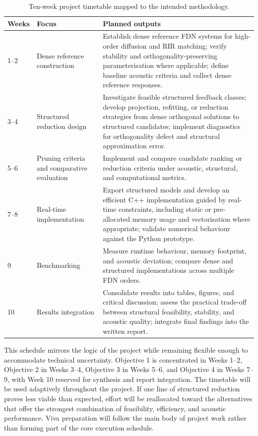 \documentclass[12pt,a4paper]{article}
\begin{document}
\begin{table}[!htbp]
\centering
\caption{Ten-week project timetable mapped to the intended methodology.}
\label{tab:timetable}
\begin{tabular}{|p{1.2cm}|p{3.5cm}|p{10.0cm}|}
\toprule
\textbf{Weeks} & \textbf{Focus} & \textbf{Planned outputs} \\
\midrule
1--2 & Dense reference construction & Establish dense reference FDN systems for high-order diffusion and RIR matching; verify stability and orthogonality-preserving parameterisation where applicable; define baseline acoustic criteria and collect dense reference responses. \\
3--4 & Structured reduction design & Investigate feasible structured feedback classes; develop projection, refitting, or reduction strategies from dense orthogonal solutions to structured candidates; implement diagnostics for orthogonality defect and structural approximation error. \\
5--6 & Pruning criteria and comparative evaluation & Implement and compare candidate ranking or reduction criteria under acoustic, structural, and computational metrics. \\
7--8 & Real-time implementation & Export structured models and develop an efficient C++ implementation guided by real-time constraints, including static or pre-allocated memory usage and vectorisation where appropriate; validate numerical behaviour against the Python prototype. \\
9 & Benchmarking & Measure runtime behaviour, memory footprint, and acoustic deviation; compare dense and structured implementations across multiple FDN orders. \\
10 & Results integration & Consolidate results into tables, figures, and critical discussion; assess the practical trade-off between structural feasibility, stability, and acoustic quality; integrate final findings into the written report. \\
\bottomrule
\end{tabular}
\end{table}

This schedule mirrors the logic of the project while remaining flexible enough to
accommodate technical uncertainty. Objective 1 is concentrated in Weeks 1--2,
Objective 2 in Weeks 3--4, Objective 3 in Weeks 5--6, and Objective 4 in
Weeks 7--9, with Week 10 reserved for synthesis and report integration. The
timetable will be used adaptively throughout the project. If one line of
structured reduction proves less viable than expected, effort will be
reallocated toward the alternatives that offer the strongest combination of
feasibility, efficiency, and acoustic performance. Viva preparation will follow
the main body of project work rather than forming part of the core execution
schedule.
\end{document}
